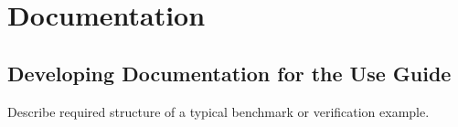 %
%

\section{Documentation}

\subsection{Developing Documentation for the Use Guide}

Describe required structure of a typical benchmark or verification example.





